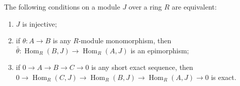 The following conditions on a module $J$ over a ring $R$ are equivalent:
\begin{enumerate}
\item[(i)] $J$ is injective;
\item[(ii)] if $\theta : A \to B$ is any $R$-module monomorphism, then $\bar{\theta} : \operatorname{Hom}_R(B, J) \to \operatorname{Hom}_R(A, J)$ is an epimorphism;
\item[(iii)] if $0 \to A \to B \to C \to 0$ is any short exact sequence, then $0 \to \operatorname{Hom}_R(C, J) \to \operatorname{Hom}_R(B, J) \to \operatorname{Hom}_R(A, J) \to 0$ is exact.
\end{enumerate}
